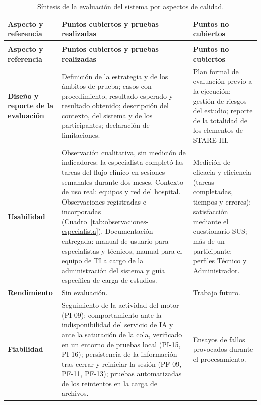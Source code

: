 \begingroup
\footnotesize
\setlength{\tabcolsep}{4pt}
\renewcommand{\arraystretch}{1.15}
\begin{longtable}{|>{\raggedright\arraybackslash}p{}|>{\raggedright\arraybackslash}p{}|>{\raggedright\arraybackslash}p{}|}
\caption{Síntesis de la evaluación del sistema por aspectos de calidad.}
\label{tab:sintesis-aspectos}\\
\hline
\textbf{Aspecto y referencia} & \textbf{Puntos cubiertos y pruebas realizadas} & \textbf{Puntos no cubiertos} \\
\hline
\endfirsthead

\multicolumn{3}{c}{\textit{Continuación del Cuadro~\thetable}}\\
\hline
\textbf{Aspecto y referencia} & \textbf{Puntos cubiertos y pruebas realizadas} & \textbf{Puntos no cubiertos} \\
\hline
\endhead

\textbf{Diseño y reporte de la evaluación} \citep{Nykanen2011GEPHI,Talmon2009STAREHI} &
Definición de la estrategia y de los ámbitos de prueba; casos con procedimiento, resultado esperado y resultado obtenido; descripción del contexto, del sistema y de los participantes; declaración de limitaciones. &
Plan formal de evaluación previo a la ejecución; gestión de riesgos del estudio; reporte de la totalidad de los elementos de STARE-HI. \\
\hline

\textbf{Usabilidad} \citep{ISO9241-11:2018,Brooke1996SUS} &
Observación cualitativa, sin medición de indicadores: la especialista completó las tareas del flujo clínico en sesiones semanales durante dos meses. Contexto de uso real: equipos y red del hospital. Observaciones registradas e incorporadas (Cuadro~\ref{tab:observaciones-especialista}). Documentación entregada: manual de usuario para especialistas y técnicos, manual para el equipo de TI a cargo de la administración del sistema y guía específica de carga de estudios. &
Medición de eficacia y eficiencia (tareas completadas, tiempos y errores); satisfacción mediante el cuestionario SUS; más de un participante; perfiles Técnico y Administrador. \\
\hline

\textbf{Rendimiento} &
Sin evaluación. &
Trabajo futuro. \\
\hline

\textbf{Fiabilidad} &
Seguimiento de la actividad del motor (PI-09); comportamiento ante la indisponibilidad del servicio de IA y ante la saturación de la cola, verificado en un entorno de pruebas local (PI-15, PI-16); persistencia de la información tras cerrar y reiniciar la sesión (PF-09, PF-11, PF-13); pruebas automatizadas de los reintentos en la carga de archivos. &
Ensayos de fallos provocados durante el procesamiento. \\
\hline


\end{longtable}
